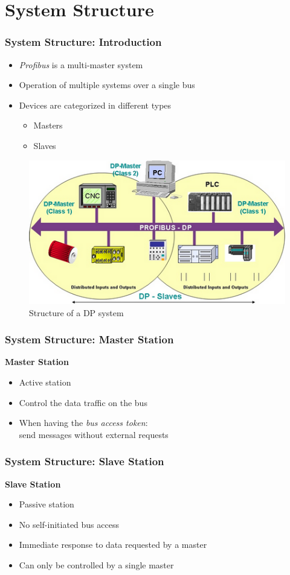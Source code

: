 \documentclass{beamer}
\begin{document}
\section{System Structure}
\begin{frame}
  \frametitle{System Structure: Introduction}
  \begin{itemize}
    \item \textit{Profibus} is a multi-master system
    \item Operation of multiple systems over a single bus
    \item Devices are categorized in different types
      \begin{itemize}
        \item Masters
        \item Slaves
      \end{itemize}
  \end{itemize}
  \vspace{-30pt}
      \center
      \begin{figure}
        \includegraphics[width=.55\textwidth]{img/dp_system.png}
        \caption{Structure of a DP system~\cite{profibusmanual}}
      \end{figure}
\end{frame}

\begin{frame}
  \frametitle{System Structure: Master Station}
  \textbf{Master Station}
  \begin{itemize}
    \item Active station
    \item Control the data traffic on the bus
    \item When having the \textit{bus access token}: \\
      send messages without external requests
  \end{itemize}
\end{frame}

\begin{frame}
  \frametitle{System Structure: Slave Station}
  \textbf{Slave Station}
  \begin{itemize}
    \item Passive station
    \item No self-initiated bus access
    \item Immediate response to data requested by a master
    \item Can only be controlled by a single master
  \end{itemize}
\end{frame}
\end{document}
